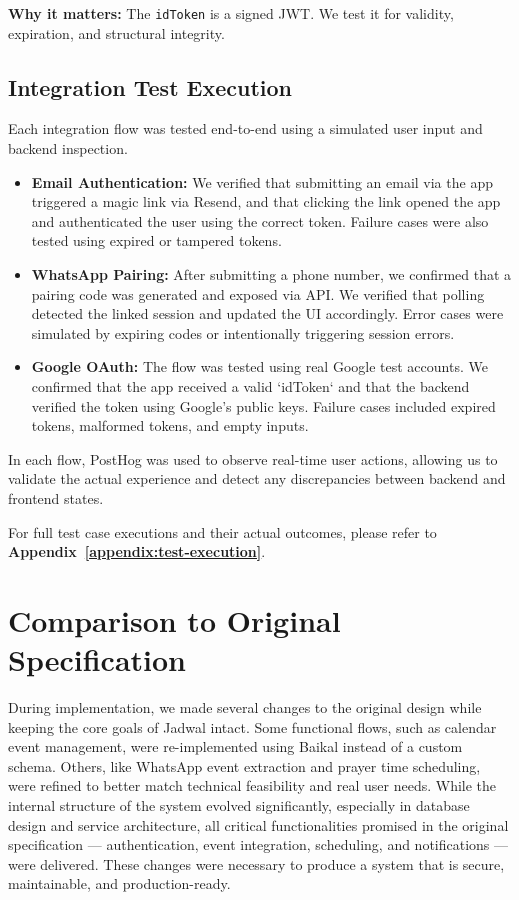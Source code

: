 \textbf{Why it matters:} The \texttt{idToken} is a signed JWT. We test it for validity, expiration, and structural integrity.

\subsection*{Integration Test Execution}

Each integration flow was tested end-to-end using a simulated user input and backend inspection.

\begin{itemize}
    \item \textbf{Email Authentication:} We verified that submitting an email via the app triggered a magic link via Resend, and that clicking the link opened the app and authenticated the user using the correct token. Failure cases were also tested using expired or tampered tokens.
    \item \textbf{WhatsApp Pairing:} After submitting a phone number, we confirmed that a pairing code was generated and exposed via API. We verified that polling detected the linked session and updated the UI accordingly. Error cases were simulated by expiring codes or intentionally triggering session errors.
    \item \textbf{Google OAuth:} The flow was tested using real Google test accounts. We confirmed that the app received a valid `idToken` and that the backend verified the token using Google's public keys. Failure cases included expired tokens, malformed tokens, and empty inputs.
\end{itemize}

In each flow, PostHog was used to observe real-time user actions, allowing us to validate the actual experience and detect any discrepancies between backend and frontend states.

For full test case executions and their actual outcomes, please refer to \textbf{Appendix~\ref{appendix:test-execution}}.

\section{Comparison to Original Specification}

During implementation, we made several changes to the original design while keeping the core goals of Jadwal intact. Some functional flows, such as calendar event management, were re-implemented using Baikal instead of a custom schema. Others, like WhatsApp event extraction and prayer time scheduling, were refined to better match technical feasibility and real user needs. While the internal structure of the system evolved significantly, especially in database design and service architecture, all critical functionalities promised in the original specification — authentication, event integration, scheduling, and notifications — were delivered. These changes were necessary to produce a system that is secure, maintainable, and production-ready.


